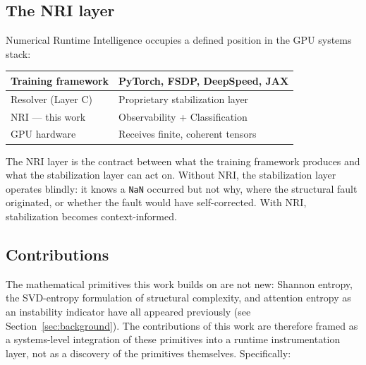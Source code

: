 \documentclass[11pt,a4paper]{article}
\theoremstyle{plain}
\begin{document}
\subsection{The NRI layer}

Numerical Runtime Intelligence occupies a defined position in the
GPU systems stack:

\begin{center}
\ttfamily\small
\begin{tabular}{ll}
\hline
Training framework & PyTorch, FSDP, DeepSpeed, JAX \\
\hline
Resolver (Layer C) & Proprietary stabilization layer \\
\hline
NRI --- this work & Observability + Classification \\
\hline
GPU hardware & Receives finite, coherent tensors \\
\hline
\end{tabular}
\end{center}

The NRI layer is the contract between what the training framework
produces and what the stabilization layer can act on.
Without NRI, the stabilization layer operates blindly: it knows a
\texttt{NaN} occurred but not why, where the structural fault originated,
or whether the fault would have self-corrected.
With NRI, stabilization becomes context-informed.

\subsection{Contributions}

The mathematical primitives this work builds on are not new: Shannon
entropy, the SVD-entropy formulation of structural complexity, and
attention entropy as an instability indicator have all appeared
previously (see Section~\ref{sec:background}). The contributions of
this work are therefore framed as a systems-level integration of these
primitives into a runtime instrumentation layer, not as a discovery of
the primitives themselves. Specifically:
\end{document}
